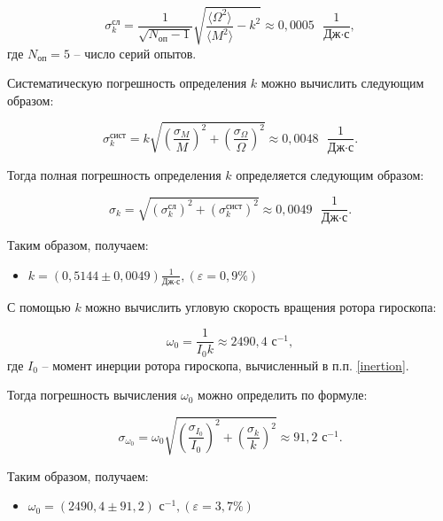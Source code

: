\documentclass[a4paper,12pt]{article} %
\begin{document}
\begin{equation}
\sigma^\text{сл}_k = \frac{1}{\sqrt{N_\text{оп}-1}} \sqrt{\frac{\langle \Omega^2 \rangle}{\langle M^2 \rangle} - k^2} \approx 0,0005 \text{ } \frac{1}{\text{Дж} \cdot \text{с}},
\end{equation}
где $ N_\text{оп} = 5 $ -- число серий опытов.

Систематическую погрешность определения $ k $ можно вычислить следующим образом:

\begin{equation}
\sigma^\text{сист}_k = k\sqrt{\left( \frac{\sigma_M}{M} \right)^2+\left(\frac{\sigma_\Omega}{\Omega} \right)^2} \approx 0,0048 \text{ } \frac{1}{\text{Дж} \cdot \text{с}}.
\end{equation}

Тогда полная погрешность определения $ k $ определяется следующим образом:

\begin{equation}
\sigma_k = \sqrt{\left( \sigma_k^\text{сл} \right)^2 + \left( \sigma_k^\text{сист} \right)^2  } \approx 0,0049 \text{ } \frac{1}{\text{Дж} \cdot \text{с}}.
\end{equation}

Таким образом, получаем:

\begin{itemize}
	\item \underline{$ k =\left( 0,5144 \pm 0,0049 \right) \frac{1}{\text{Дж} \cdot \text{с}} , \left( \varepsilon = 0,9 \% \right) $}
\end{itemize}

С помощью $ k $ можно вычислить угловую скорость вращения ротора гироскопа:

\begin{equation}
\omega_0 = \frac{1}{I_0 k} \approx 2490,4 \text{ с}^{-1},
\end{equation}
где $ I_0 $ -- момент инерции ротора гироскопа, вычисленный в п.п. \ref{inertion}.

Тогда погрешность вычисления $ \omega_0 $ можно определить по формуле:

\begin{equation}
\sigma_{\omega_0} = \omega_0 \sqrt{\left( \frac{\sigma_{I_0}}{I_0} \right)^2 + \left( \frac{\sigma_k}{k} \right)^2} \approx 91,2 \text{ с}^{-1}.
\end{equation}

Таким образом, получаем:

\begin{itemize}
	\item \underline{$ \omega_0 =\left( 2490,4 \pm 91,2 \right) \text{ с}^{-1} , \left( \varepsilon = 3,7 \% \right) $}
\end{itemize}
\end{document}
